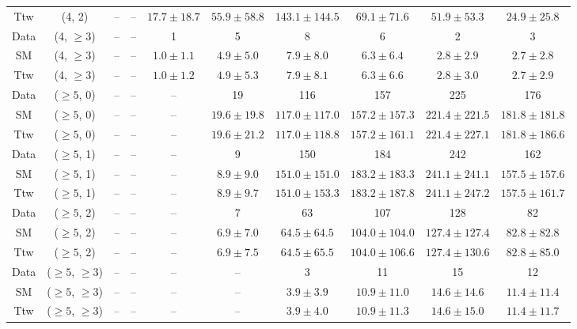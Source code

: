 \begin{table}[h!]
{\begin{tabular}{cccccccccc}
	Ttw & (4, 2) & -- & -- & $17.7\pm 18.7$ & $55.9\pm 58.8$ & $143.1\pm 144.5$ & $69.1\pm 71.6$ & $51.9\pm 53.3$ & $24.9\pm 25.8$ \\[0.5ex] 
	Data & (4, $\ge3$) & -- & -- & 1 & 5 & 8 & 6 & 2 & 3 \\[0.5ex] 
	SM & (4, $\ge3$) & -- & -- & $1.0\pm 1.1$ & $4.9\pm 5.0$ & $7.9\pm 8.0$ & $6.3\pm 6.4$ & $2.8\pm 2.9$ & $2.7\pm 2.8$ \\[0.5ex] 
	Ttw & (4, $\ge3$) & -- & -- & $1.0\pm 1.2$ & $4.9\pm 5.3$ & $7.9\pm 8.1$ & $6.3\pm 6.6$ & $2.8\pm 3.0$ & $2.7\pm 2.9$ \\[0.5ex] 
	Data & ($\ge5$, 0) & -- & -- & -- & 19 & 116 & 157 & 225 & 176 \\[0.5ex] 
	SM & ($\ge5$, 0) & -- & -- & -- & $19.6\pm 19.8$ & $117.0\pm 117.0$ & $157.2\pm 157.3$ & $221.4\pm 221.5$ & $181.8\pm 181.8$ \\[0.5ex] 
	Ttw & ($\ge5$, 0) & -- & -- & -- & $19.6\pm 21.2$ & $117.0\pm 118.8$ & $157.2\pm 161.1$ & $221.4\pm 227.1$ & $181.8\pm 186.6$ \\[0.5ex] 
	Data & ($\ge5$, 1) & -- & -- & -- & 9 & 150 & 184 & 242 & 162 \\[0.5ex] 
	SM & ($\ge5$, 1) & -- & -- & -- & $8.9\pm 9.0$ & $151.0\pm 151.0$ & $183.2\pm 183.3$ & $241.1\pm 241.1$ & $157.5\pm 157.6$ \\[0.5ex] 
	Ttw & ($\ge5$, 1) & -- & -- & -- & $8.9\pm 9.7$ & $151.0\pm 153.3$ & $183.2\pm 187.8$ & $241.1\pm 247.2$ & $157.5\pm 161.7$ \\[0.5ex] 
	Data & ($\ge5$, 2) & -- & -- & -- & 7 & 63 & 107 & 128 & 82 \\[0.5ex] 
	SM & ($\ge5$, 2) & -- & -- & -- & $6.9\pm 7.0$ & $64.5\pm 64.5$ & $104.0\pm 104.0$ & $127.4\pm 127.4$ & $82.8\pm 82.8$ \\[0.5ex] 
	Ttw & ($\ge5$, 2) & -- & -- & -- & $6.9\pm 7.5$ & $64.5\pm 65.5$ & $104.0\pm 106.6$ & $127.4\pm 130.6$ & $82.8\pm 85.0$ \\[0.5ex] 
	Data & ($\ge5$, $\ge3$) & -- & -- & -- & -- & 3 & 11 & 15 & 12 \\[0.5ex] 
	SM & ($\ge5$, $\ge3$) & -- & -- & -- & -- & $3.9\pm 3.9$ & $10.9\pm 11.0$ & $14.6\pm 14.6$ & $11.4\pm 11.4$ \\[0.5ex] 
	Ttw & ($\ge5$, $\ge3$) & -- & -- & -- & -- & $3.9\pm 4.0$ & $10.9\pm 11.3$ & $14.6\pm 15.0$ & $11.4\pm 11.7$ \\[0.5ex] 
	\hline
	\hline
\end{tabular}}
\end{table}
